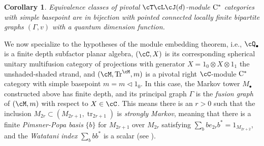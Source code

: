 \documentclass[11pt]{article}
\theoremstyle{plain}
\newtheorem{coralpha}[thmalpha]{Corollary}
\theoremstyle{definition}
\DeclareMathOperator{\Tr}{Tr}
\DeclareMathOperator{\tr}{tr}
\newcommand{\Cstar}{\rm{C^*}}
\begin{document}
\begin{coralpha}
\label{cor:TLJPivotalModuleClassification}
Equivalence classes of pivotal $\cT\cL\cJ(d)$-module $\Cstar$ categories with simple basepoint
are in bijection with 
pointed connected locally finite bipartite graphs $(\Gamma, v)$ with a quantum dimension function.
\end{coralpha}


We now specialize to the hypotheses of the module embedding theorem, i.e., $\cQ_\bullet$ is a finite depth subfactor planar algebra, $(\cC, X)$ is its corresponding spherical unitary multifusion category of projections with generator $X= 1_0 \otimes X \otimes 1_1$ the unshaded-shaded strand, and $(\cM, \Tr^\cM, m)$ is a pivotal right $\cC$-module $\Cstar$ category with simple basepoint $m = m\vartriangleleft 1_0$.
In this case, the Markov tower $M_\bullet$ constructed above has finite depth, and its principal graph $\Gamma$ is the \emph{fusion graph} of $(\cM,m)$ with respect to $X\in \cC$.
This means there is an $r>0$ such that the inclusion $M_{2r} \subset (M_{2r+1}, \tr_{2r+1})$ is \emph{strongly Markov}, meaning that there is a finite \emph{Pimsner-Popa basis} $\{b\}$ for $M_{2r+1}$ over $M_{2r}$ satisfying $\sum_b be_{2r} b^* = 1_{M_{2r+2}}$, and the \emph{Watatani index} $\sum_b bb^*$ \cite{MR996807} is a scalar (see \cite[1.1.4(c)]{MR1278111}).
\end{document}
